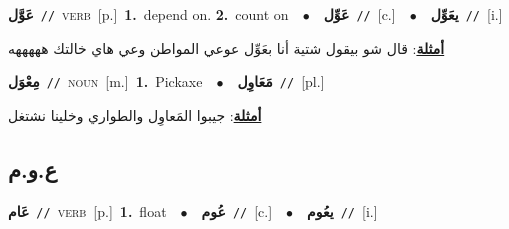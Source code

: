 \documentclass[10pt,a4paper,twoside]{article} %
\begin{document}
\begin{multicols}{2}
{\setlength\topsep{0pt}\textbf{\foreignlanguage{arabic}{عَوَّل}}\ {\color{gray}\texttt{//}\color{black}}\ \textsc{verb}\ [p.]\ \textbf{1.}~depend on.  \textbf{2.}~count on\ \ $\bullet$\ \ \setlength\topsep{0pt}\textbf{\foreignlanguage{arabic}{عَوِّل}}\ {\color{gray}\texttt{//}\color{black}}\ [c.]\ \ $\bullet$\ \ \setlength\topsep{0pt}\textbf{\foreignlanguage{arabic}{يعَوِّل}}\ {\color{gray}\texttt{//}\color{black}}\ [i.]\  \begin{flushright}\color{gray}\foreignlanguage{arabic}{\textbf{\underline{\foreignlanguage{arabic}{أمثلة}}}: قال شو بيقول شتية أنا بعَوِّل عوعي المواطن وعي هاي خالتك هههههه}\end{flushright}\color{black}} \vspace{2mm}

{\setlength\topsep{0pt}\textbf{\foreignlanguage{arabic}{مِعْوَل}}\ {\color{gray}\texttt{//}\color{black}}\ \textsc{noun}\ [m.]\ \textbf{1.}~Pickaxe\ \ $\bullet$\ \ \setlength\topsep{0pt}\textbf{\foreignlanguage{arabic}{مَعَاوِل}}\ {\color{gray}\texttt{//}\color{black}}\ [pl.]\  \begin{flushright}\color{gray}\foreignlanguage{arabic}{\textbf{\underline{\foreignlanguage{arabic}{أمثلة}}}: جيبوا المَعاوِل والطواري وخلينا نشتغل}\end{flushright}\color{black}} \vspace{2mm}

\vspace{-3mm}
\subsection*{\color{blue}\foreignlanguage{arabic}{ع.و.م}\color{blue}{}} 

{\setlength\topsep{0pt}\textbf{\foreignlanguage{arabic}{عَام}}\ {\color{gray}\texttt{//}\color{black}}\ \textsc{verb}\ [p.]\ \textbf{1.}~float\ \ $\bullet$\ \ \setlength\topsep{0pt}\textbf{\foreignlanguage{arabic}{عُوم}}\ {\color{gray}\texttt{//}\color{black}}\ [c.]\ \ $\bullet$\ \ \setlength\topsep{0pt}\textbf{\foreignlanguage{arabic}{يعُوم}}\ {\color{gray}\texttt{//}\color{black}}\ [i.]\ } \vspace{2mm}


\end{multicols}
\end{document}
